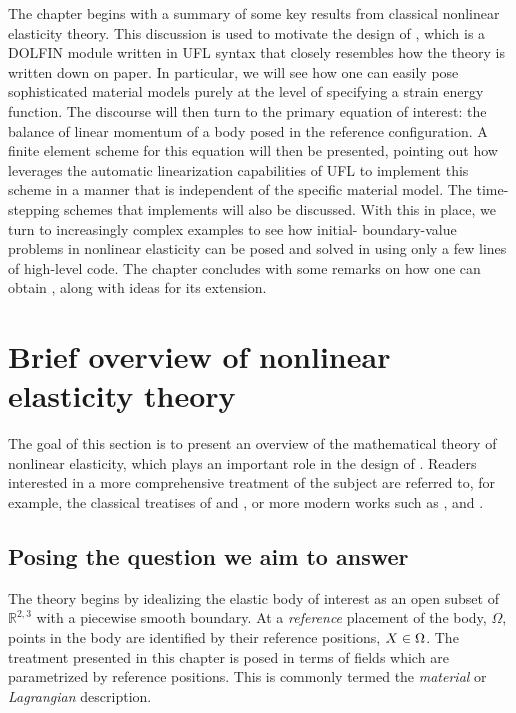 The chapter begins with a summary of some key results from classical
nonlinear elasticity theory. This discussion is used to motivate the
design of \twist, which is a DOLFIN \citep{LoggWells2010} module
written in UFL syntax \citep{AlnaesLogg2009} that closely resembles
how the theory is written down on paper. In particular, we will see
how one can easily pose sophisticated material models purely at the
level of specifying a strain energy function. The discourse will then
turn to the primary equation of interest: the balance of linear
momentum of a body posed in the reference configuration. A finite
element scheme for this equation will then be presented, pointing out
how \twist{} leverages the automatic linearization capabilities of UFL
to implement this scheme in a manner that is independent of the
specific material model. The time-stepping schemes that \twist{}
implements will also be discussed. With this in place, we turn to
increasingly complex examples to see how initial- boundary-value
problems in nonlinear elasticity can be posed and solved in \twist{}
using only a few lines of high-level code. The chapter concludes with
some remarks on how one can obtain \twist, along with ideas for its extension.

\pagebreak

\section{Brief overview of nonlinear elasticity theory}

The goal of this section is to present an overview of the mathematical
theory of nonlinear elasticity, which plays an important role in the
design of \twist. Readers interested in a more comprehensive treatment
of the subject are referred to, for example, the classical treatises
of \citet{TruesdellToupin1960} and \citet{TruesdellNoll1965}, or more
modern works such as \citet{Gurtin1981}, \citet{Ogden1997} and
\citet{Holzapfel2000}.

\subsection{Posing the question we aim to answer}

The theory begins by idealizing the elastic body of interest as an open
subset of $\mathbb{R}^{2, 3}$ with a piecewise smooth boundary. At a
{\em reference} placement of the body, $\Omega$, points in the body
are identified by their reference positions, $\mbox{$ X$} \in \Omega$. The
treatment presented in this chapter is posed in terms of fields which
are parametrized by reference positions. This is commonly termed the
{\em material} or {\em Lagrangian} description.

